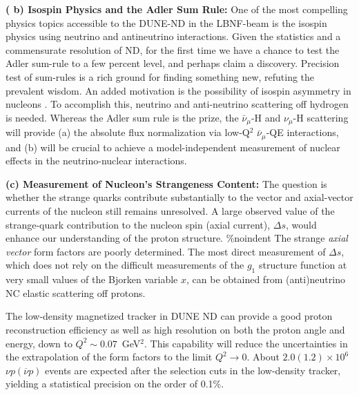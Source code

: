 \vspace{0.25cm} 
\noindent 
{\bf ( b) Isospin Physics and the Adler Sum Rule:} One of the most compelling physics topics 
accessible to the DUNE-ND in the LBNF-beam is the isospin physics 
using neutrino and antineutrino interactions. Given the statistics and a commensurate 
resolution of ND, for the first time we have a chance to test the Adler sum-rule to a 
few percent level, and perhaps claim a discovery. 
Precision test of sum-rules is a rich ground for finding something new, refuting the prevalent wisdom. 
An added motivation is the possibility of isospin asymmetry in nucleons . 
\vspace{0.25cm} 
\noindent 
To accomplish this, neutrino and anti-neutrino scattering off hydrogen is needed. 
Whereas the Adler sum rule is the prize, the $\bar \nu_\mu$-H and $\nu_\mu$-H scattering
will provide (a)  the 
absolute flux normalization via low-Q$^2$ $\bar \nu_\mu$-QE interactions,  
and (b) will be crucial to achieve a model-independent measurement of nuclear effects in the 
neutrino-nuclear interactions. 

\vspace{0.25cm} 
\noindent 
{\bf (c) Measurement of Nucleon's Strangeness Content:} The question is whether the strange
  quarks contribute substantially to the vector and axial-vector
  currents of the nucleon still remains unresolved. A large observed value of the
  strange-quark contribution to the nucleon spin (axial current),
  $\Delta s$, would enhance our understanding of the proton structure.
\%noindent 
The strange \emph{axial vector} form factors are poorly 
determined. The most direct measurement of $\Delta s$, which does not rely on the difficult
measurements of the $g_1$ structure function at very small values of the Bjorken variable $x$, 
can be obtained from (anti)neutrino NC elastic scattering off protons.  %

\vspace{0.25cm} 
\noindent 
The low-density magnetized tracker in DUNE ND can provide a good proton reconstruction efficiency as well as
high resolution on both the proton angle and energy, down to $Q^2\sim0.07$~GeV$^2$. 
This capability will reduce the uncertainties in the extrapolation of the form factors to the limit
$Q^2 \to 0$. About $2.0 (1.2) \times 10^6$ $\nu p
(\overline{\nu} p)$ events are expected after the selection cuts in
the low-density tracker, yielding a statistical precision on the order
of 0.1\%.



